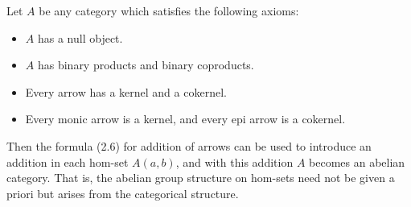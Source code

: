 Let $A$ be any category which satisfies the following axioms:
\begin{itemize}
\item[(i)] $A$ has a null object.
\item[(ii')] $A$ has binary products and binary coproducts.
\item[(iii)] Every arrow has a kernel and a cokernel.
\item[(iv)] Every monic arrow is a kernel, and every epi arrow is a cokernel.
\end{itemize}
Then the formula (2.6) for addition of arrows can be used to introduce an addition in each hom-set $A(a, b)$, and with this addition $A$ becomes an abelian category. That is, the abelian group structure on hom-sets need not be given a priori but arises from the categorical structure.
